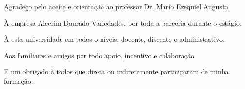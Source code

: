 \documentclass[
	12pt,
	openright,
	oneside, %
	a4paper,
	chapter=TITLE,
	section=TITLE,
	english,
	brazil %
	]{abntex2-udesc}
\begin{document}
\frenchspacing

\ifdraft{}{\imprimircapa}

\ifdraft{}{\imprimirfolhaderosto}


\begin{agradecimentos}
\SingleSpacing
Agradeço pelo aceite e orientação ao professor Dr. Mario Ezequiel Augusto.

À empresa Alecrim Dourado Variedades, por toda a parceria durante o estágio.

À esta universidade em todos o níveis, docente, discente e administrativo.

Aos familiares e amigos por todo apoio, incentivo e colaboração

E um obrigado à todos que direta ou indiretamente participaram de minha formação.
\end{agradecimentos}


\end{document}

